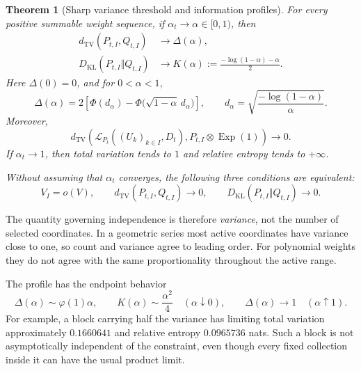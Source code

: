 \documentclass[11pt,a4paper]{article}
\numberwithin{equation}{section}
\newtheorem{theorem}{Theorem}[section]
\theoremstyle{definition}
\theoremstyle{remark}
\newcommand{\Pt}{P_t}
\newcommand{\TV}{d_{\mathrm{TV}}}
\newcommand{\KL}{D_{\mathrm{KL}}}
\newcommand{\Exp}{\operatorname{Exp}}
\newcommand{\Law}{\mathcal L}
\newcommand{\phiN}{\varphi}
\newcommand{\PhiN}{\Phi}
\begin{document}
\begin{theorem}[Sharp variance threshold and information profiles]
\label{thm:main}
For every positive summable weight sequence, if $\alpha_t\to\alpha\in[0,1)$, then
\begin{align}
 \TV(P_{t,I},Q_{t,I})&\longrightarrow\Delta(\alpha),\label{eq:tv-main}\\
 \KL(P_{t,I}\Vert Q_{t,I})&\longrightarrow
 K(\alpha):=\frac{-\log(1-\alpha)-\alpha}{2}.\label{eq:kl-main}
\end{align}
Here $\Delta(0)=0$, and for $0<\alpha<1$,
\begin{equation}\label{eq:delta}
 \Delta(\alpha)=2\left[\PhiN(d_\alpha)
 -\PhiN\bigl(\sqrt{1-\alpha}\,d_\alpha\bigr)\right],
 \qquad d_\alpha=\sqrt{\frac{-\log(1-\alpha)}{\alpha}}.
\end{equation}
Moreover,
\begin{equation}\label{eq:slack-factor}
 \TV\left(\Law_{\Pt}((U_k)_{k\in I},D_t),
             P_{t,I}\otimes\Exp(1)\right)\longrightarrow0.
\end{equation}
If $\alpha_t\to1$, then total variation tends to $1$ and relative
entropy tends to $+\infty$.

Without assuming that $\alpha_t$ converges, the following three
conditions are equivalent:
\begin{equation}\label{eq:iff}
 V_I=o(V),\qquad
 \TV(P_{t,I},Q_{t,I})\to0,\qquad
 \KL(P_{t,I}\Vert Q_{t,I})\to0.
\end{equation}
\end{theorem}

The quantity governing independence is therefore \emph{variance},
not the number of selected coordinates. In a geometric series most
active coordinates have variance close to one, so count and variance
agree to leading order. For polynomial weights they do not agree
with the same proportionality throughout the active range.

The profile has the endpoint behavior
\begin{equation}\label{eq:profile-ends}
 \Delta(\alpha)\sim\phiN(1)\alpha,\qquad
 K(\alpha)\sim\frac{\alpha^2}{4}\quad(\alpha\downarrow0),
 \qquad \Delta(\alpha)\to1\quad(\alpha\uparrow1).
\end{equation}
For example, a block carrying half the variance has limiting total
variation approximately $0.1660641$ and relative entropy
$0.0965736$ nats. Such a block is not asymptotically independent of
the constraint, even though every fixed collection inside it can
have the usual product limit.
\end{document}
